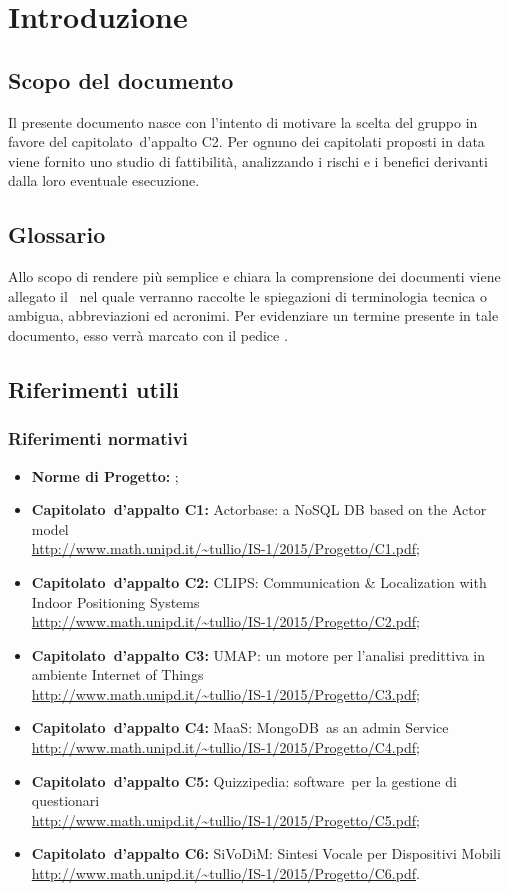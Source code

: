 \documentclass[../StudioDiFattibilita.tex]{subfiles}
\begin{document}
\section{Introduzione}
	\subsection{Scopo del documento}
	Il presente documento nasce con l'intento di motivare la scelta del gruppo \leaf in favore del capitolato\g\ d'appalto C2. Per ognuno dei capitolati proposti in data  viene fornito uno studio di fattibilità, analizzando i rischi e i benefici derivanti dalla loro eventuale esecuzione.
	\subsection{Glossario} \label{sec:Glossario}
	Allo scopo di rendere più semplice e chiara la comprensione dei documenti viene allegato il \glossariov\ nel quale verranno raccolte le spiegazioni di  terminologia tecnica o  ambigua,
	abbreviazioni ed acronimi. Per evidenziare un termine presente in tale documento, esso verrà marcato con il pedice \g.
	\subsection{Riferimenti utili}
		\subsubsection{Riferimenti normativi}
		\begin{itemize}
			\item \textbf{Norme di Progetto:} \normediprogettov;
			\item \textbf{Capitolato\g\ d'appalto C1:} Actorbase: a NoSQL DB based on the Actor model \\\url{http://www.math.unipd.it/~tullio/IS-1/2015/Progetto/C1.pdf};
			\item \textbf{Capitolato\g\ d'appalto C2:} CLIPS\g: Communication \& Localization with Indoor Positioning Systems \\\url{http://www.math.unipd.it/~tullio/IS-1/2015/Progetto/C2.pdf};
			\item \textbf{Capitolato\g\ d'appalto C3:} UMAP: un motore per l'analisi predittiva in ambiente Internet of Things\g\ \\\url{http://www.math.unipd.it/~tullio/IS-1/2015/Progetto/C3.pdf};
			\item \textbf{Capitolato\g\ d'appalto C4:} MaaS: MongoDB\g\ as an admin Service \\\url{http://www.math.unipd.it/~tullio/IS-1/2015/Progetto/C4.pdf};
			\item \textbf{Capitolato\g\ d'appalto C5:} Quizzipedia: software\g\ per la gestione di questionari \\\url{http://www.math.unipd.it/~tullio/IS-1/2015/Progetto/C5.pdf};
			\item \textbf{Capitolato\g\ d'appalto C6:} SiVoDiM: Sintesi Vocale per Dispositivi Mobili \\\url{http://www.math.unipd.it/~tullio/IS-1/2015/Progetto/C6.pdf}.
		\end{itemize}
\end{document}
